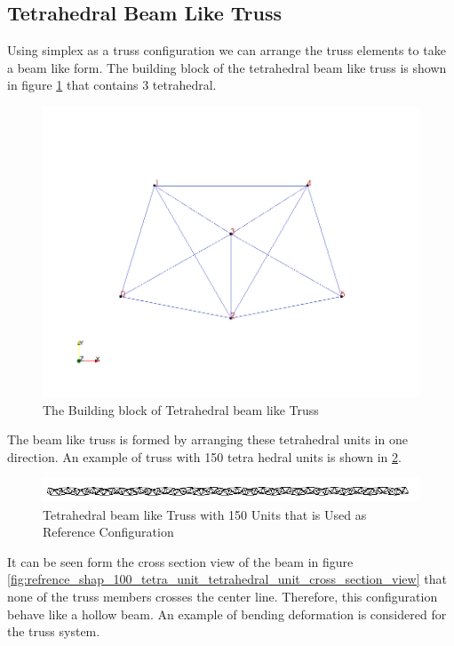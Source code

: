  
\subsection{Tetrahedral Beam Like Truss}
Using simplex as a truss configuration we can arrange the truss elements to take a beam like form.
The building block of the tetrahedral beam like truss is shown in figure \ref{fig:building_block_of_tetrahedral_truss} that contains 3 tetrahedral.
\begin{figure} 
\centering
\includegraphics[width=5.0in]{./chap_5_active_trusses/images_linear_tetrahedral/building_block_of_tetrahedral_truss.png}
\caption{The Building block of Tetrahedral beam like Truss}
\label{fig:building_block_of_tetrahedral_truss}
\end{figure} 
The beam like truss is formed by arranging these tetrahedral units in one direction.
An example of truss with 150 tetra hedral units is shown in \ref{fig:refrence_shap_100_tetra_unit_tetrahedral_unit}. 
\begin{figure} 
\centering
\includegraphics[width=5.0in]{./chap_5_active_trusses/images_linear_tetrahedral/refrence_shap_100_tetra_unit_tetrahedral_unit.png}
\caption{Tetrahedral beam like Truss with 150 Units that is Used as Reference Configuration}
\label{fig:refrence_shap_100_tetra_unit_tetrahedral_unit}
\end{figure} 
It can be seen form the cross section view of the beam in figure \ref{fig:refrence_shap_100_tetra_unit_tetrahedral_unit_cross_section_view} that none of the truss members crosses the center line.   
Therefore, this configuration behave like a hollow beam. 
An example of bending deformation is considered for the truss system.  

